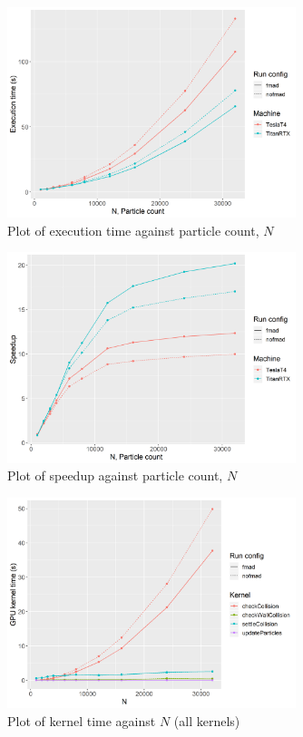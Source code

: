 \documentclass[12pt]{article}
\begin{document}
\begin{figure}[H]
    \centering
    \includegraphics[width=0.75\textwidth]{gpu-varyN}
    \caption{Plot of execution time against particle count, $N$}
    \label{fig:gpu-varyN}
\end{figure}

\begin{figure}[H]
    \centering
    \includegraphics[width=0.75\textwidth]{gpu-speedup}
    \caption{Plot of speedup against particle count, $N$}
    \label{fig:gpu-speedup}
\end{figure}

\begin{figure}[H]
    \centering
    \includegraphics[width=0.75\textwidth]{titan-fmad-kernelTime-all}
    \caption{Plot of kernel time against $N$ (all kernels)}
    \label{fig:titan-fmad-kernelTime-all}
\end{figure}
\end{document}
